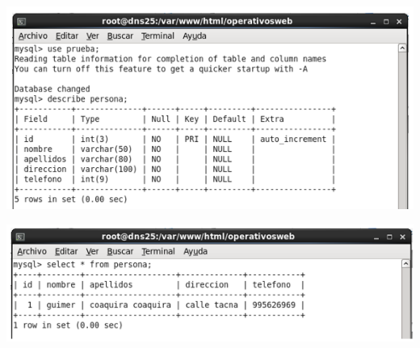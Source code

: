 \begin{itemize}
		\begin{center}
		\includegraphics[width=15cm]{./Imagenes/q}
		\end{center}
\end{itemize}

\begin{itemize}
		\begin{center}
		\includegraphics[width=15cm]{./Imagenes/r}
		\end{center}
\end{itemize}